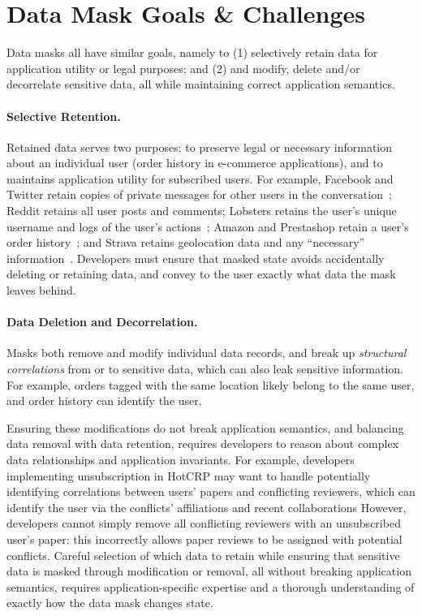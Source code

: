 \section{Data Mask Goals \& Challenges}

Data masks all have similar goals, namely to (1) selectively retain data for application
utility or legal purposes; and (2) and modify, delete and/or decorrelate sensitive data, all while
maintaining correct application semantics.

\paragraph{Selective Retention.}
Retained data serves two purposes: to preserve legal or necessary information about an individual
user (\eg order history in e-commerce applications), and to maintains application utility for
subscribed users.  For example, Facebook and Twitter retain copies of private messages for other users in
the conversation~\cite{facebook:privacy, twitter:privacy}; Reddit retains all user posts and comments;
Lobsters retains the user's unique username and logs of the user's actions~\cite{reddit:privacy};
Amazon and Prestashop retain a user's order history~\cite{amazon:privacy, prestashop:privacy}; and
Strava retains geolocation data and any ``necessary'' information~\cite{strava:privacy}. 
Developers must ensure that masked state avoids accidentally deleting or retaining data, and convey
to the user exactly what data the mask leaves behind.

\paragraph{Data Deletion and Decorrelation.}
Masks both remove and modify individual data records, and break up \emph{structural correlations}
from or to sensitive data, which can also leak sensitive information. For example, orders tagged
with the same location likely belong to the same user, and order history can identify the user. 

Ensuring these modifications do not break application semantics, and balancing data removal with
data retention, requires developers to reason about complex data relationships and application
invariants. For example, developers implementing unsubscription in HotCRP may want to handle
potentially identifying correlations between users' papers and conflicting reviewers, which can
identify the user via the conflicts' affiliations and recent collaborations However, developers
cannot simply remove all conflicting reviewers with an unsubscribed user's paper: this incorrectly
allows paper reviews to be assigned with potential conflicts. Careful selection of which data to
retain while ensuring that sensitive data is masked through modification or removal, all without
breaking application semantics, requires application-specific expertise and a thorough understanding
of exactly how the data mask changes state.


